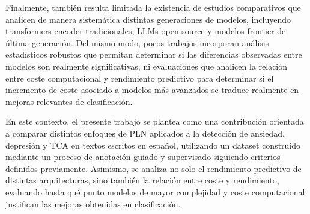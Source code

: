 Finalmente, también resulta limitada la existencia de estudios comparativos que analicen de manera sistemática distintas generaciones de modelos, incluyendo transformers encoder tradicionales, LLMs open-source y modelos frontier de última generación. Del mismo modo, pocos trabajos incorporan análisis estadísticos robustos que permitan determinar si las diferencias observadas entre modelos son realmente significativas, ni evaluaciones que analicen la relación entre coste computacional y rendimiento predictivo para determinar si el incremento de coste asociado a modelos más avanzados se traduce realmente en mejoras relevantes de clasificación. 

En este contexto, el presente trabajo se plantea como una contribución orientada a comparar distintos enfoques de \ac{PLN} aplicados a la detección de ansiedad, depresión y \ac{TCA} en textos escritos en español, utilizando un dataset construido mediante un proceso de anotación guiado y supervisado siguiendo criterios definidos previamente. Asimismo, se analiza no solo el rendimiento predictivo de distintas arquitecturas, sino también la relación entre coste y rendimiento, evaluando hasta qué punto modelos de mayor complejidad y coste computacional justifican las mejoras obtenidas en clasificación.

